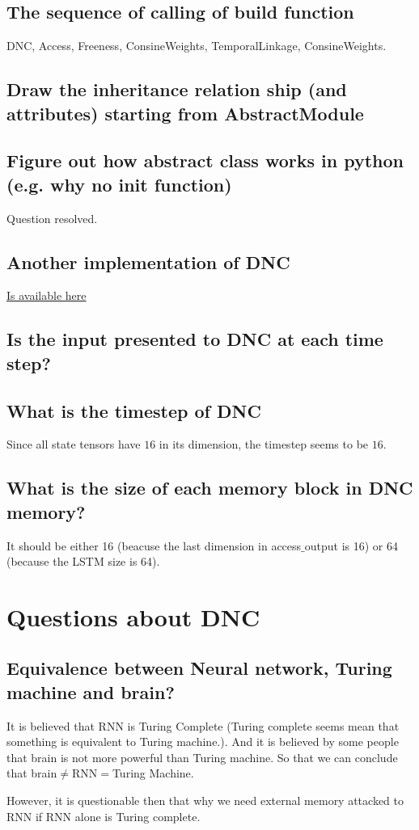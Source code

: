 \documentclass{article}
\begin{document}
\subsection{The sequence of calling of build function}
DNC, Access, Freeness, ConsineWeights, TemporalLinkage, ConsineWeights.
\subsection{Draw the inheritance relation ship (and attributes) starting from AbstractModule}
\subsection{Figure out how abstract class works in python (e.g. why no init function)}
Question resolved.

\subsection{Another implementation of DNC}
\href{https://github.com/Mostafa-Samir/DNC-tensorflow/blob/master/dnc/dnc.py}{Is available here}

\subsection{Is the input presented to DNC at each time step?}

\subsection{What is the timestep of DNC}
Since all state tensors have $16$ in its dimension, the timestep seems to be $16$.

\subsection{What is the size of each memory block in DNC memory?}
It should be either 16 (beacuse the last dimension in access$\_$output is 16) or 64 (because the LSTM size is 64).

\section{Questions about DNC}
\subsection{Equivalence between Neural network, Turing machine and brain?}
It is believed that RNN is Turing Complete (Turing complete seems mean that something is equivalent to Turing machine.). And it is believed by some people that brain is not more powerful than Turing machine. So that we can conclude that brain$\neq$RNN$=$Turing Machine.

However, it is questionable then that why we need external memory attacked to RNN if RNN alone is Turing complete.
\end{document}
